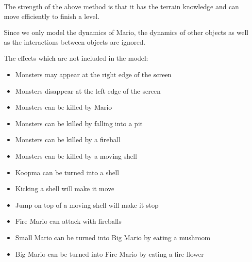 The strength of the above method is that it has the terrain knowledge and can move
efficiently to finish a level.









%


Since we only model the dynamics of Mario, the dynamics of other objects as well as 
the interactions between objects are ignored. 

The effects which are not included in the model:
\begin{itemize}
\item Monsters may appear at the right edge of the screen
\item Monsters disappear at the left edge of the screen
\item Monsters can be killed by Mario
\item Monsters can be killed by falling into a pit
\item Monsters can be killed by a fireball
\item Monsters can be killed by a moving shell
\item Koopma can be turned into a shell
\item Kicking a shell will make it move
\item Jump on top of a moving shell will make it stop
\item Fire Mario can attack with fireballs
\item Small Mario can be turned into Big Mario by eating a mushroom
\item Big Mario can be turned into Fire Mario by eating a fire flower
\end{itemize}

